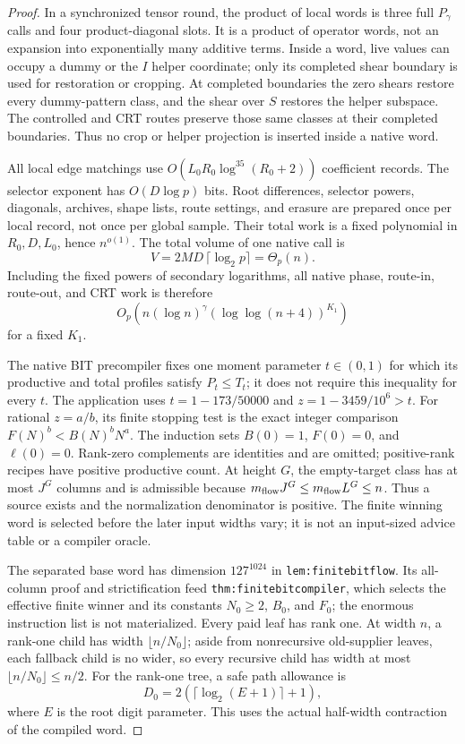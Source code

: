 \begin{proof}
In a synchronized tensor round, the product of local words is three full
$P_\gamma$ calls and four product-diagonal slots.  It is a product of
operator words, not an expansion into exponentially many additive terms.
Inside a word, live values can occupy a dummy or the $I$ helper coordinate;
only its completed shear boundary is used for restoration or cropping.
At completed boundaries the zero shears restore every dummy-pattern class,
and the shear over $S$ restores the helper subspace.  The controlled and
CRT routes preserve those same classes at their completed boundaries.
Thus no crop or helper projection is inserted inside a native word.

All local edge matchings use
$O(L_0R_0\log^{35}(R_0+2))$ coefficient records.  The selector exponent
has $O(D\log p)$ bits.  Root differences, selector powers, diagonals,
archives, shape lists, route settings, and erasure are prepared once per
local record, not once per global sample.  Their total work is a fixed
polynomial in $R_0,D,L_0$, hence $n^{o(1)}$.  The total volume of one
native call is
\[
  V=2MD\,\lceil\log_2 p\rceil=\Theta_p(n).
\]
Including the fixed powers of secondary logarithms, all native phase,
route-in, route-out, and CRT work is therefore
\begin{equation}
\label{upd:native-cost}
  O_p\!\left(n(\log n)^\gamma
                 (\log\log(n+4))^{K_1}\right)
\end{equation}
for a fixed $K_1$.

The native BIT precompiler fixes one moment parameter $t\in(0,1)$ for
which its productive and total profiles satisfy $P_t\leq T_t$; it does
not require this inequality for every $t$.  The application uses
$t=1-173/50000$ and $z=1-3459/10^6>t$.  For rational $z=a/b$, its finite
stopping test is the exact integer comparison
$F(N)^b<B(N)^bN^a$.  The induction sets $B(0)=1$, $F(0)=0$, and
$\ell(0)=0$.  Rank-zero complements are identities and are omitted;
positive-rank recipes have positive productive count.  At height $G$,
the empty-target class has at most $J^G$ columns and is admissible because
$m_{\rm flow}J^G\leq m_{\rm flow}L^G\leq n$.  Thus a source exists and
the normalization denominator is positive.  The finite winning word is
selected before the later input widths vary; it is not an input-sized
advice table or a compiler oracle.

The separated base word has dimension $127^{1024}$ in
\texttt{lem:finitebitflow}.  Its all-column proof and strictification feed
\texttt{thm:finitebitcompiler}, which selects the effective finite winner
and its constants $N_0\geq2$, $B_0$, and $F_0$; the enormous instruction
list is not materialized.  Every paid leaf has rank one.  At width $n$,
a rank-one child has width $\lfloor n/N_0\rfloor$; aside from
nonrecursive old-supplier leaves, each fallback child is no wider, so
every recursive child has width at most
$\lfloor n/N_0\rfloor\leq n/2$.  For the rank-one tree, a safe path
allowance is
\[
  D_0=2(\lceil\log_2(E+1)\rceil+1),
\]
where $E$ is the root digit parameter.  This uses the actual half-width
contraction of the compiled word.


\end{proof}
